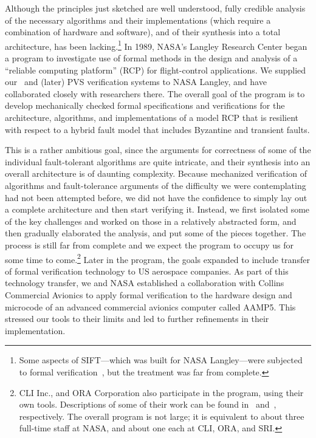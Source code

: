 Although the principles just sketched are well understood, fully
credible analysis of the necessary algorithms and their
implementations (which require a combination of hardware and
software), and of their synthesis into a total architecture, has been
lacking.\footnote{Some aspects of SIFT---which was built for NASA
Langley---were subjected to formal verification~\cite{Sift}, but the
treatment was far from complete.} In 1989, NASA's Langley Research
Center began a program to investigate use of formal methods in the
design and analysis of a ``reliable computing platform'' (RCP) for
flight-control applications.  We supplied our \ehdm\ and (later) PVS
verification systems to NASA Langley, and have collaborated closely
with researchers there.  The overall goal of the program is to
develop mechanically checked formal specifications and verifications
for the architecture, algorithms, and implementations of a model RCP
that is resilient with respect to a hybrid fault model that
includes Byzantine and transient faults.


This is a rather ambitious goal, since the arguments for correctness
of some of the individual fault-tolerant algorithms are
quite intricate, and their synthesis into an overall architecture is
of daunting complexity.  Because mechanized verification of
algorithms and fault-tolerance arguments of the difficulty we were
contemplating had not been attempted before, we did not have the
confidence to simply lay out a complete architecture and then start
verifying it.  Instead, we first isolated some of the key challenges
and worked on those in a relatively abstracted form, and then
gradually elaborated the analysis, and put some of the pieces
together.  The process is still far from complete and we expect the
program to occupy us for some time to come.\footnote{CLI Inc., and
ORA Corporation also participate in the program, using their own
tools.  Descriptions of some of their work can be found
in~\cite{Bevier&Young92} and~\cite{Bickford&Srivas:Byz}, respectively.
The overall program is not large; it is equivalent to about three
full-time staff at NASA, and about one each at CLI, ORA, and SRI.}
Later in the program, the goals expanded to include transfer of
formal verification technology to US aerospace companies.  As part of
this technology transfer, we and NASA established a collaboration
with Collins Commercial Avionics to apply formal verification to the
hardware design and microcode of an advanced commercial avionics
computer called AAMP5\@.  This stressed our tools to their limits and
led to further refinements in their implementation.

